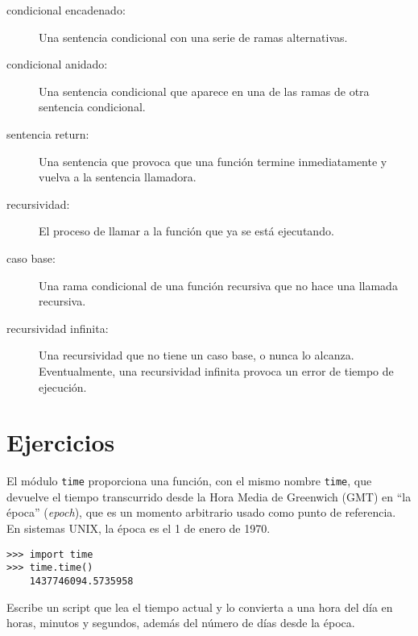 \documentclass[10pt]{book}
\begin{document}
\begin{description}
\item[condicional encadenado:]  Una sentencia condicional con una serie
de ramas alternativas.

\item[condicional anidado:]  Una sentencia condicional que aparece
en una de las ramas de otra sentencia condicional.

\item[sentencia return:] Una sentencia que provoca que una función
termine inmediatamente y vuelva a la sentencia llamadora.

\item[recursividad:]  El proceso de llamar a la función que ya se está
ejecutando.

\item[caso base:]  Una rama condicional de una
función recursiva que no hace una llamada recursiva.

\item[recursividad infinita:]  Una recursividad que no tiene un
caso base, o nunca lo alcanza.  Eventualmente, una recursividad infinita
provoca un error de tiempo de ejecución.

\end{description}

\section{Ejercicios}

\begin{exercise}

El módulo {\tt time} proporciona una función, con el mismo nombre {\tt time}, que
devuelve el tiempo transcurrido desde la Hora Media de Greenwich (GMT) en ``la época'' ({\em epoch}), que es
un momento arbitrario usado como punto de referencia.  En sistemas UNIX, la
época es el 1 de enero de 1970.

\begin{verbatim}
>>> import time
>>> time.time()
    1437746094.5735958
\end{verbatim}

Escribe un script que lea el tiempo actual y lo convierta a
una hora del día en horas, minutos y segundos, además del número de
días desde la época.

\end{exercise}
\end{document}
